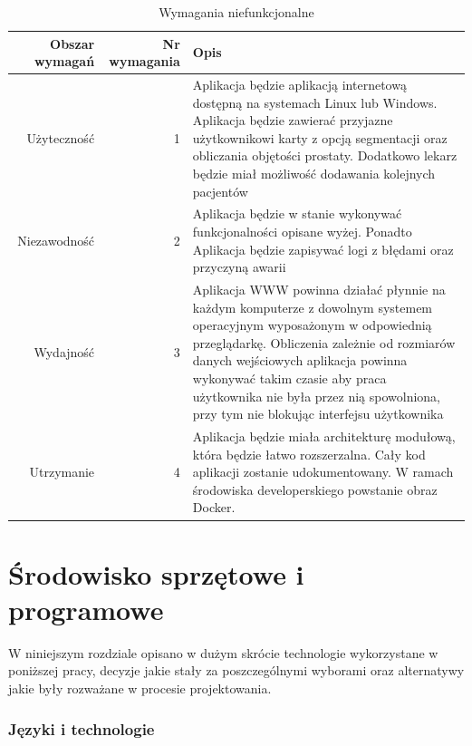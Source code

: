 \documentclass[a4paper,11pt,twoside]{report}
\theoremstyle{definition}
\begin{document}
\begin{table}[h!]
\caption{Wymagania niefunkcjonalne}
\centering
\begin{tabular}{|r|r|p{10cm}|} \hline 
	Obszar wymagań & Nr wymagania & Opis \\ \hline 
	Użyteczność & 1 & Aplikacja będzie aplikacją internetową dostępną na systemach Linux lub Windows. Aplikacja będzie zawierać przyjazne użytkownikowi karty z opcją segmentacji oraz obliczania objętości prostaty. Dodatkowo lekarz będzie miał możliwość dodawania kolejnych pacjentów \\ \hline 
	Niezawodność & 2 & Aplikacja będzie w stanie wykonywać funkcjonalności opisane wyżej. Ponadto Aplikacja będzie zapisywać logi z błędami oraz przyczyną awarii \\ \hline 
	Wydajność & 3 & Aplikacja WWW powinna działać płynnie na każdym
komputerze z dowolnym systemem operacyjnym wyposażonym
w odpowiednią przeglądarkę. Obliczenia zależnie od rozmiarów danych wejściowych aplikacja powinna wykonywać takim czasie aby praca użytkownika nie była przez nią spowolniona, przy tym nie blokując interfejsu użytkownika \\ \hline 
	Utrzymanie & 4 & Aplikacja będzie miała architekturę modułową, która będzie łatwo rozszerzalna. Cały kod aplikacji zostanie udokumentowany. W ramach środowiska developerskiego powstanie obraz Docker.  \\ \hline 
\end{tabular}
\label{Wymagania niefunkcjonalne}
\end{table}

\section{Środowisko sprzętowe i programowe}

W niniejszym rozdziale opisano w dużym skrócie technologie wykorzystane w poniższej pracy, decyzje jakie stały za poszczególnymi wyborami oraz alternatywy jakie były rozważane w procesie projektowania.

\subsubsection{Języki i technologie }
\end{document}
